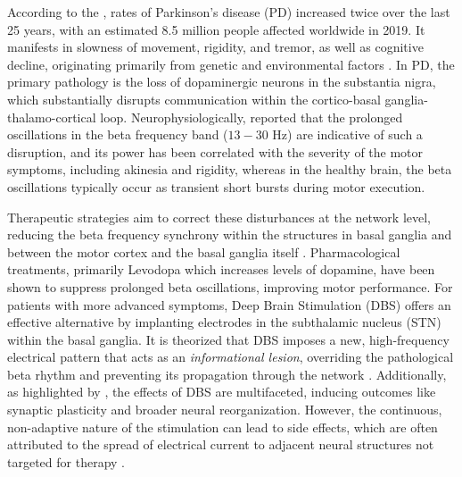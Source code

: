\documentclass[12pt, a4paper]{article}
\begin{document}
According to the \textcite{who_parkinson_2023}, rates of Parkinson's disease (PD) increased twice over the last 25 years, with an estimated 8.5 million people affected worldwide in 2019. It manifests in slowness of movement, rigidity, and tremor, as well as cognitive decline, originating primarily from genetic and environmental factors \parencite{ben-shlomoEpidemiologyParkinsonsDisease2024}. In PD, the primary pathology is the loss of dopaminergic neurons in the substantia nigra, which substantially disrupts communication within the cortico-basal ganglia-thalamo-cortical loop.  Neurophysiologically, \textcite{tinkhauserBetaBurstDynamics2017} reported that the prolonged oscillations in the beta frequency band ($13-30$ Hz) are indicative of such a disruption, and its power has been correlated with the severity of the motor symptoms, including akinesia and rigidity, whereas in the healthy brain, the beta oscillations typically occur as transient short bursts during motor execution.


Therapeutic strategies aim to correct these disturbances at the network level, reducing the beta frequency synchrony within the structures in basal ganglia and between the motor cortex and the basal ganglia itself \parencite{tinkhauserBetaBurstDynamics2017, paulsCorticalBetaBurst2022}. Pharmacological treatments, primarily Levodopa which increases levels of dopamine, have been shown to suppress prolonged beta oscillations, improving motor performance. For patients with more advanced symptoms, Deep Brain Stimulation (DBS) offers an effective alternative by implanting electrodes in the subthalamic nucleus (STN) within the basal ganglia. It is theorized that DBS imposes a new, high-frequency electrical pattern that acts as an \textit{informational lesion}, overriding the pathological beta rhythm and preventing its propagation through the network \parencite{chikenMechanismDeepBrain2016,mcintyreNetworkPerspectivesMechanisms2010}. Additionally, as highlighted by \textcite{wuComputationalModelsAdvance2024}, the effects of DBS are multifaceted, inducing outcomes like synaptic plasticity and broader neural reorganization. However, the continuous, non-adaptive nature of the stimulation can lead to side effects, which are often attributed to the spread of electrical current to adjacent neural structures not targeted for therapy \parencite{zarzyckiStimulationinducedSideEffects2020}.
\end{document}
